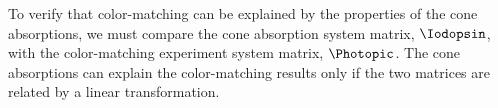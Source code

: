 To verify that color-matching can be explained by the properties of
the cone absorptions, we must compare the cone absorption system
matrix, $\Iodopsin$, with the color-matching experiment system matrix,
$\Photopic$.  The cone absorptions can explain the color-matching
results only if the two matrices are related by a linear transformation.


